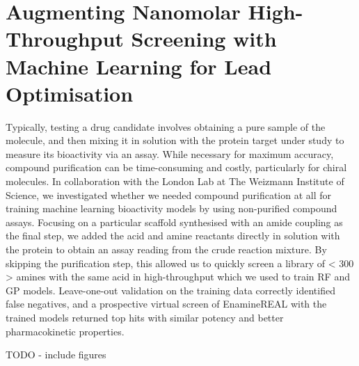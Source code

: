 \chapter{Augmenting Nanomolar High-Throughput Screening with Machine Learning for Lead Optimisation}

Typically, testing a drug candidate involves obtaining a pure sample of the molecule, and then mixing it in solution with the protein target under study to measure its bioactivity via an assay. While necessary for maximum accuracy, compound purification can be time-consuming and costly, particularly for chiral molecules. In collaboration with the London Lab at The Weizmann Institute of Science, we investigated whether we needed compound purification at all for training machine learning bioactivity models by using non-purified compound assays. Focusing on a particular scaffold synthesised with an amide coupling as the final step, we added the acid and amine reactants directly in solution with the protein to obtain an assay reading from the crude reaction mixture. By skipping the purification step, this allowed us to quickly screen a library of < 300 > amines with the same acid in high-throughput which we used to train RF and GP models. Leave-one-out validation on the training data correctly identified false negatives, and a prospective virtual screen of EnamineREAL with the trained models returned top hits with similar potency and better pharmacokinetic properties.

TODO - include figures